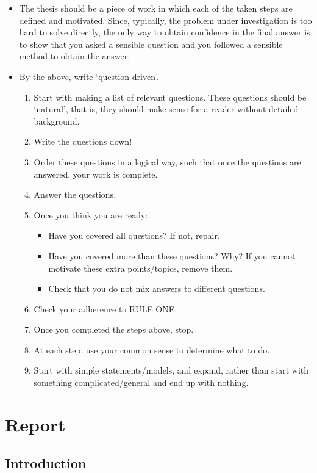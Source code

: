 \documentclass{article}
\begin{document}
\begin{itemize}
\item The thesis should be a piece of work in which each of the taken
  steps are defined and motivated. Since, typically, the problem under
  investigation is too hard to solve directly, the only way to obtain
  confidence in the final answer is to show that you asked a sensible
  question and you followed a sensible method to obtain the answer. 
\item By the above, write `question driven'.  
\begin{enumerate}
\item Start with making a list of relevant questions.  These questions
  should be `natural', that is, they should make sense for a reader
  without detailed background.
\item Write the questions down!
\item Order these questions in a logical way, such that once the
  questions are answered, your work is complete.
\item Answer the questions.
\item Once you think you are ready: 
  \begin{itemize}
  \item Have you covered all questions? If not, repair.
  \item Have you covered more than these questions? Why? If you cannot
    motivate these extra points/topics, remove them. 
  \item Check that you do not mix answers to different questions.
  \end{itemize}
\item Check your adherence to RULE ONE.
\item Once you completed the steps  above, stop. 
\item At each step: use your common sense to determine what to
  do. 
\item Start with simple statements/models, and expand, rather than
  start with something complicated/general and end up with nothing.
\end{enumerate}
\end{itemize}



\section{Report}
\label{sec:report}



\subsection{Introduction}
\label{sec:introduction}
\end{document}
